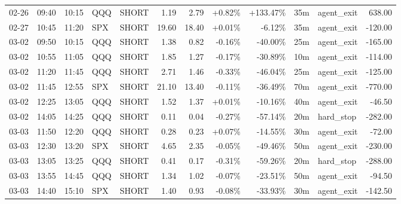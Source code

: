 \documentclass[11pt,a4paper,twoside]{article}
\begin{document}
\begin{center}
\begin{longtable}{>{\color{txtmain}}l l l l l r r r r r >{\color{txtmain}}l r}
02-26 & 09:40 & 10:15 & QQQ & SHORT & 1.19 & 2.79 & \textcolor{wingreen}{+0.82\%} & \textcolor{wingreen}{+133.47\%} & 35m & agent\_exit & \textcolor{wingreen}{638.00} \\
02-27 & 10:45 & 11:20 & SPX & SHORT & 19.60 & 18.40 & \textcolor{wingreen}{+0.01\%} & \textcolor{lossred}{-6.12\%} & 35m & agent\_exit & \textcolor{lossred}{-120.00} \\
03-02 & 09:50 & 10:15 & QQQ & SHORT & 1.38 & 0.82 & \textcolor{lossred}{-0.16\%} & \textcolor{lossred}{-40.00\%} & 25m & agent\_exit & \textcolor{lossred}{-165.00} \\
03-02 & 10:55 & 11:05 & QQQ & SHORT & 1.85 & 1.27 & \textcolor{lossred}{-0.17\%} & \textcolor{lossred}{-30.89\%} & 10m & agent\_exit & \textcolor{lossred}{-114.00} \\
03-02 & 11:20 & 11:45 & QQQ & SHORT & 2.71 & 1.46 & \textcolor{lossred}{-0.33\%} & \textcolor{lossred}{-46.04\%} & 25m & agent\_exit & \textcolor{lossred}{-125.00} \\
03-02 & 11:45 & 12:55 & SPX & SHORT & 21.10 & 13.40 & \textcolor{lossred}{-0.11\%} & \textcolor{lossred}{-36.49\%} & 70m & agent\_exit & \textcolor{lossred}{-770.00} \\
03-02 & 12:25 & 13:05 & QQQ & SHORT & 1.52 & 1.37 & \textcolor{wingreen}{+0.01\%} & \textcolor{lossred}{-10.16\%} & 40m & agent\_exit & \textcolor{lossred}{-46.50} \\
03-02 & 14:05 & 14:25 & QQQ & SHORT & 0.11 & 0.04 & \textcolor{lossred}{-0.27\%} & \textcolor{lossred}{-57.14\%} & 20m & hard\_stop & \textcolor{lossred}{-282.00} \\
03-03 & 11:50 & 12:20 & QQQ & SHORT & 0.28 & 0.23 & \textcolor{wingreen}{+0.07\%} & \textcolor{lossred}{-14.55\%} & 30m & agent\_exit & \textcolor{lossred}{-72.00} \\
03-03 & 12:30 & 13:20 & SPX & SHORT & 4.65 & 2.35 & \textcolor{lossred}{-0.05\%} & \textcolor{lossred}{-49.46\%} & 50m & agent\_exit & \textcolor{lossred}{-230.00} \\
03-03 & 13:05 & 13:25 & QQQ & SHORT & 0.41 & 0.17 & \textcolor{lossred}{-0.31\%} & \textcolor{lossred}{-59.26\%} & 20m & hard\_stop & \textcolor{lossred}{-288.00} \\
03-03 & 13:55 & 14:45 & QQQ & SHORT & 1.34 & 1.02 & \textcolor{lossred}{-0.07\%} & \textcolor{lossred}{-23.51\%} & 50m & agent\_exit & \textcolor{lossred}{-94.50} \\
03-03 & 14:40 & 15:10 & SPX & SHORT & 1.40 & 0.93 & \textcolor{lossred}{-0.08\%} & \textcolor{lossred}{-33.93\%} & 30m & agent\_exit & \textcolor{lossred}{-142.50} \\

\end{longtable}
\end{center}
\end{document}
